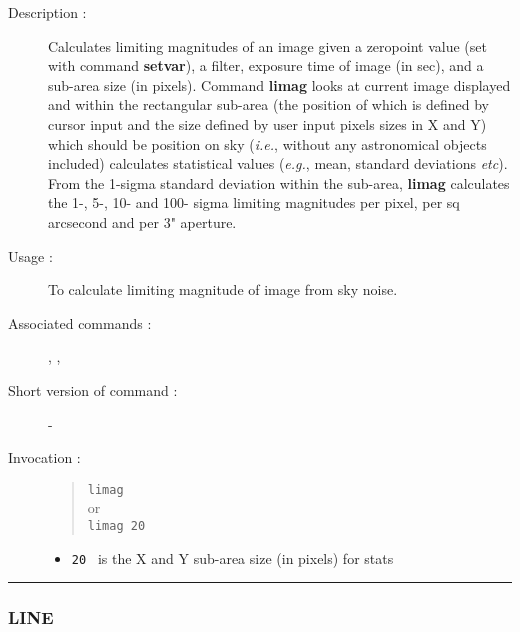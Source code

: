 \begin{description}

\item[Description :] Calculates limiting magnitudes of an image given a
zeropoint value (set with command {\bf setvar}), a filter, exposure time of
image (in sec), and a sub-area size (in pixels). Command {\bf limag} looks at
current image displayed and within the rectangular sub-area (the
position of which is defined by cursor input and the size defined by
user input pixels sizes in X and Y) which should be position on sky
(\emph{i.e.}, without any astronomical objects included) calculates
statistical values (\emph{e.g.}, mean, standard deviations \emph{etc}).
From the 1-sigma standard deviation within the sub-area, {\bf limag}
calculates the 1-, 5-, 10- and 100- sigma limiting magnitudes per
pixel, per sq arcsecond and per 3" aperture.

\item[Usage :] To calculate limiting magnitude of image from sky noise.
\item[Associated commands :] {\tt {}}, 
{\tt {}}, {\tt {}}
\item[Short version of command :] -
\item[Invocation :]

\begin{quote}{\tt  limag }\\
or \\
{\tt limag 20 }
\end{quote}

\begin{itemize}

\item {\tt 20 } is the X and Y sub-area size (in pixels) for stats
\end{itemize}

\end{description}

\hrule 
\subsubsection*{\label{LINE}LINE}

